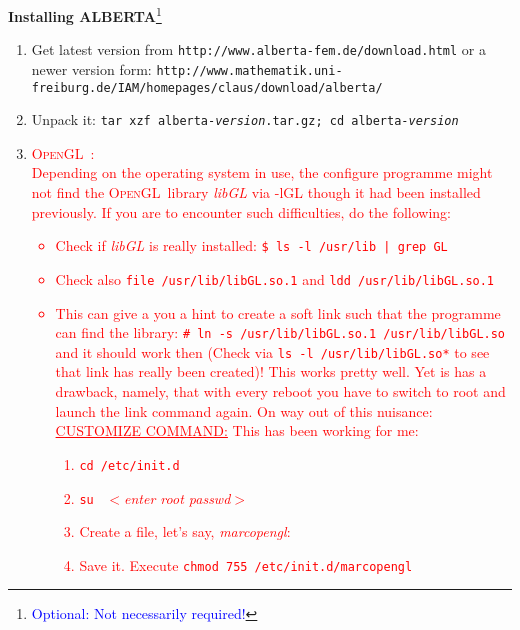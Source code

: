 \documentclass[a4paper,12pt]{article}
\newcommand{\opengl}{\textsc{OpenGL}\ }
\newcommand{\dyeitred}{\textcolor{red}}{}
\newcommand{\dyeitblue}{\textcolor{blue}}{}
\begin{document}
\medskip
\begin{center}
 \large {\textbf{\textsf{Installing ALBERTA}}\footnote{\dyeitblue{Optional: Not necessarily required!}}}
\end{center}

\begin{enumerate}
  \item Get latest version from \texttt{http://www.alberta-fem.de/download.html} or a newer version form: \newline
    \texttt{http://www.mathematik.uni-freiburg.de/IAM/homepages/claus/download/alberta/}
  \item Unpack it: \texttt{tar xzf alberta-\textit{version}.tar.gz; cd
    alberta-\textit{version}}
  \item \dyeitred{\Stopsign \opengl:\\ Depending on the operating system in use, the configure programme might not find the \opengl library \textit{libGL} via -lGL though it had been installed previously. If you are to encounter such difficulties, do the following:  \begin{itemize} \item Check if \textit{libGL} is really installed: \texttt{\$ ls -l /usr/lib | grep GL} \item Check also \texttt{file /usr/lib/libGL.so.1} and \texttt{ldd /usr/lib/libGL.so.1} \item This can give a you a hint to create a soft link such that the programme can find the library: \newline \texttt{\# ln -s /usr/lib/libGL.so.1 /usr/lib/libGL.so}\\ and it should work then (Check via \texttt{ls -l /usr/lib/libGL.so*} to see that link has really been created)! This works pretty well. Yet is has a drawback, namely, that with every reboot you have to switch to root and launch the link command again. On way out of this nuisance:\\
\underline{CUSTOMIZE COMMAND:} This has been working for me:
\begin{enumerate}
  \item \texttt{cd /etc/init.d}
  \item \texttt{su} \ \textit{$<$enter root passwd$>$}
  \item Create a file, let's say, \textit{marcopengl}:
    \begin{center}
     
    \end{center}
    \item Save it. Execute \texttt{chmod 755 /etc/init.d/marcopengl}

\end{enumerate}
\end{itemize}}
\end{enumerate}
\end{document}
